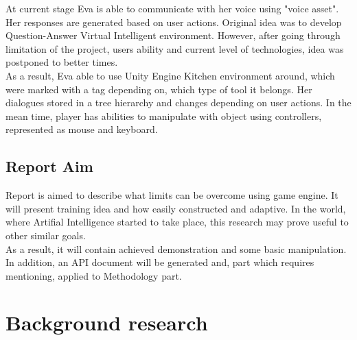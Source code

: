 \documentclass[18pt]{article}
\numberwithin{equation}{section} %
\numberwithin{figure}{section} %
\numberwithin{table}{section} %
\begin{document}
	At current stage Eva is able to communicate with her voice using "voice asset". Her responses are generated based on user actions. Original idea was to develop Question-Answer Virtual Intelligent environment. However, after going through limitation of the project, users ability and current level of technologies, idea was postponed to better times. \\	
	
	As a result, Eva able to use Unity Engine Kitchen environment around, which were marked with a tag depending on, which type of tool it belongs. Her dialogues stored in a tree hierarchy and changes depending on user actions. In the mean time, player has abilities to manipulate with object using controllers, represented as mouse and keyboard.
\subsection{Report Aim}
	Report is aimed to describe what limits can be overcome using game engine. It will present training idea and how easily constructed and adaptive. In the world, where Artifial Intelligence started to take place, this research may prove useful to other similar goals.\\
	
	As a result, it will contain achieved demonstration and some basic manipulation. In addition, an API document will be generated and, part which requires mentioning, applied to Methodology part.
	
\section{Background research}	
\end{document}
